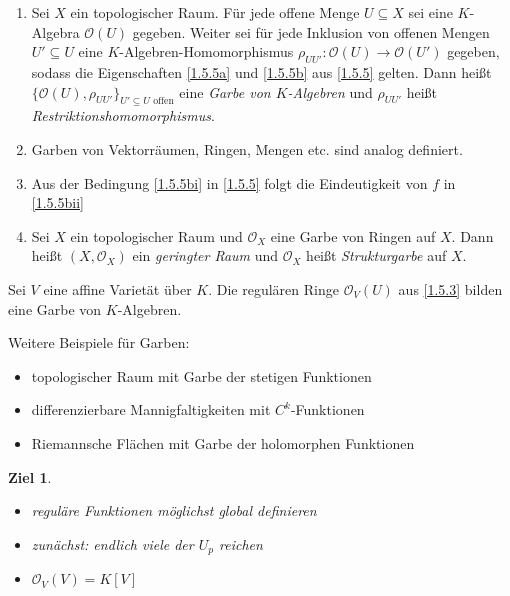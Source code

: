 \documentclass[a4paper,12pt]{scrbook}
\theoremstyle{blah}
\newtheorem*{ziel}{Ziel}
\theoremstyle{stz}
\def\O{\mathcal{O}}
\newcommand{\ra}{\longrightarrow}
\begin{document}
\begin{dfn}\label{1.5.6}
  \begin{enumerate}
  \item Sei $X$ ein topologischer Raum. Für jede offene Menge $U\subseteq X$ sei eine $K$-Algebra $\O(U)$ gegeben. Weiter sei
    für jede Inklusion von offenen Mengen $U'\subseteq U$ eine $K$-Algebren-Homomorphismus $\rho_{UU'}\colon\O(U)\ra\O(U')$
    gegeben, sodass die Eigenschaften \ref{1.5.5a} und \ref{1.5.5b} aus \autoref{1.5.5} gelten. Dann heißt
    $\{\O(U),\rho_{UU'}\}_{U'\subseteq U\text{ offen}}$ eine \emph{Garbe von $K$-Algebren} und $\rho_{UU'}$ heißt
    \emph{Restriktionshomomorphismus}.
  \item Garben von Vektorräumen, Ringen, Mengen etc. sind analog definiert.
  \item Aus der Bedingung \ref{1.5.5bi} in \autoref{1.5.5} folgt die Eindeutigkeit von $f$ in \ref{1.5.5bii}
  \item Sei $X$ ein topologischer Raum und $\O_X$ eine Garbe von Ringen auf $X$. Dann heißt $(X,\O_X)$ ein \emph{geringter Raum}
    und $\O_X$ heißt \emph{Strukturgarbe} auf $X$.
  \end{enumerate}
\end{dfn}

\begin{bem}\label{1.5.7}
  Sei $V$ eine affine Varietät über $K$. Die regulären Ringe $\O_V(U)$ aus \autoref{1.5.3} bilden eine Garbe von $K$-Algebren.
\end{bem}

\begin{bsp}\label{1.5.8}
  Weitere Beispiele für Garben:
  \begin{itemize}
  \item topologischer Raum mit Garbe der stetigen Funktionen
  \item differenzierbare Mannigfaltigkeiten mit $C^k$-Funktionen
  \item Riemannsche Flächen mit Garbe der holomorphen Funktionen
  \end{itemize}
\end{bsp}

\begin{ziel}
  \begin{itemize}
  \item reguläre Funktionen möglichst global definieren
  \item zunächst: endlich viele der $U_p$ reichen
  \item $\O_V(V)=K[V]$
  \end{itemize}
\end{ziel}
\end{document}
